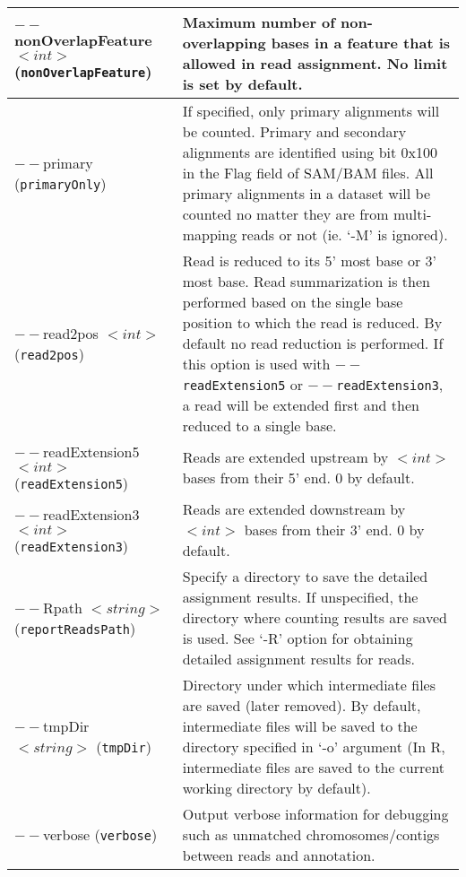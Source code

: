 \documentclass[12pt]{report}
\newcommand{\code}[1]{{\small\texttt{#1}}}
\newcommand{\R}{\textsf{R}}
\begin{document}
\begin{longtable}{|p{5cm}|p{11cm}|}
\hline
$--$nonOverlapFeature $<int>$ \newline (\code{nonOverlapFeature}) & Maximum number of non-overlapping bases in a feature that is allowed in read assignment. No limit is set by default. \\
\hline
$--$primary \newline (\code{primaryOnly}) & If specified, only primary alignments will be counted. Primary and secondary alignments are identified using bit 0x100 in the Flag field of SAM/BAM files. All primary alignments in a dataset will be counted no matter they are from multi-mapping reads or not (ie. `-M' is ignored).\\
\hline
$--$read2pos $<int>$ \newline (\code{read2pos}) & Read is reduced to its 5' most base or 3' most base. Read summarization is then performed based on the single base position to which the read is reduced. By default no read reduction is performed. If this option is used with \code{$--$readExtension5} or \code{$--$readExtension3}, a read will be extended first and then reduced to a single base. \\
\hline
$--$readExtension5 $<int>$ \newline (\code{readExtension5}) & Reads are extended upstream by $<int>$ bases from their 5' end. 0 by default.\\
\hline
$--$readExtension3 $<int>$ \newline (\code{readExtension3}) & Reads are extended downstream by $<int>$ bases from their 3' end. 0 by default.\\
\hline
$--$Rpath $<string>$ \newline (\code{reportReadsPath}) & Specify a directory to save the detailed assignment results. If unspecified, the directory where counting results are saved is used. See `-R' option for obtaining detailed assignment results for reads.\\
\hline
$--$tmpDir $<string>$ \newline (\code{tmpDir}) & Directory under which intermediate files are saved (later removed). By default, intermediate files will be saved to the directory specified in `-o' argument (In \R, intermediate files are saved to the current working directory by default).\\
\hline
$--$verbose \newline (\code{verbose}) & Output verbose information for debugging such as unmatched chromosomes/contigs between reads and annotation.\\
\hline
\end{longtable}
\end{document}
